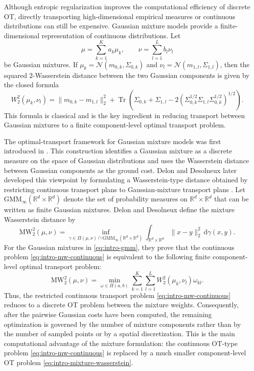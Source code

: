 \documentclass[a4paper,11pt]{article}
\numberwithin{equation}{section}
\DeclareMathOperator{\Tr}{Tr}
\newcommand{\RR}{\mathbb{R}}
\newcommand{\GMM}{\mathrm{GMM}}
\newcommand{\MW}{\mathrm{MW}}
\newcommand{\dd}{\,\mathrm{d}}
\begin{document}
Although entropic regularization improves the computational efficiency of discrete OT, directly transporting high-dimensional empirical measures or continuous distributions can still be expensive. Gaussian mixture models provide a finite-dimensional representation of continuous distributions. Let
\begin{equation}\label{eq:intro-gmm}
  \mu = \sum_{k = 1}^{K} a_k\mu_k, \qquad \nu = \sum_{l = 1}^{L} b_l\nu_l
\end{equation}
be Gaussian mixtures. If $\mu_k = \mathcal N(m_{0,k},\Sigma_{0,k})$ and $\nu_l = \mathcal N(m_{1,l},\Sigma_{1,l})$, then the squared $2$-Wasserstein distance between the two Gaussian components is given by the closed formula
\begin{equation}\label{eq:intro-gaussian-w2}
  W_2^2(\mu_k,\nu_l) = \|m_{0,k}-m_{1,l}\|_2^2 + \Tr\left( \Sigma_{0,k} + \Sigma_{1,l} - 2(\Sigma_{0,k}^{1/2}\Sigma_{1,l}\Sigma_{0,k}^{1/2})^{1/2} \right).
\end{equation}
This formula is classical \cite{dowson1982frechet,gelbrich1990formula} and is the key ingredient in reducing transport between Gaussian mixtures to a finite component-level optimal transport problem.

The optimal-transport framework for Gaussian mixture models was first introduced in \cite{chen2019optimal}. This construction identifies a Gaussian mixture as a discrete measure on the space of Gaussian distributions and uses the Wasserstein distance between Gaussian components as the ground cost. Delon and Desolneux later developed this viewpoint by formulating a Wasserstein-type distance obtained by restricting continuous transport plans to Gaussian-mixture transport plans \cite{delon-2020}. Let $\GMM_{\infty}(\RR^d \times \RR^d)$ denote the set of probability measures on $\RR^d \times \RR^d$ that can be written as finite Gaussian mixtures. Delon and Desolneux define the mixture Wasserstein distance by
\begin{equation}\label{eq:intro-mw-continuous}
  \MW_2^2(\mu,\nu) = \inf_{\gamma \in \Pi(\mu,\nu) \cap \GMM_{\infty}(\RR^d \times \RR^d)} \int_{\RR^d \times \RR^d} \|x-y\|_2^2 \dd\gamma(x,y).
\end{equation}
For the Gaussian mixtures in \eqref{eq:intro-gmm}, they prove that the continuous problem \eqref{eq:intro-mw-continuous} is equivalent to the following finite component-level optimal transport problem:
\begin{equation}\label{eq:intro-mixture-wasserstein}
  \MW_2^2(\mu,\nu) = \min_{\omega \in \Pi(a,b)} \sum_{k = 1}^{K} \sum_{l = 1}^{L} W_2^2(\mu_k,\nu_l)\omega_{kl}.
\end{equation}
Thus, the restricted continuous transport problem \eqref{eq:intro-mw-continuous} reduces to a discrete OT problem between the mixture weights. Consequently, after the pairwise Gaussian costs have been computed, the remaining optimization is governed by the number of mixture components rather than by the number of sampled points or by a spatial discretization. This is the main computational advantage of the mixture formulation: the continuous OT-type problem \eqref{eq:intro-mw-continuous} is replaced by a much smaller component-level OT problem \eqref{eq:intro-mixture-wasserstein}.
\end{document}
